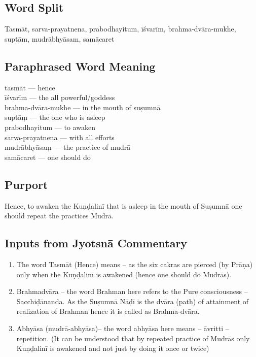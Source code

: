 \subsection*{Word Split}

Tasmāt, sarva-prayatnena, prabodhayitum, īśvarīm, brahma-dvāra-mukhe, suptām, mudrābhyāsam, samācaret

\subsection*{Paraphrased Word Meaning}

\begin{multicols}{2}
tasmāt --- hence \\
īśvarīm --- the all powerful/goddess\\
brahma-dvāra-mukhe --- in the mouth of suṣumnā\\
suptāṃ --- the one who is asleep \\
prabodhayitum --- to awaken\\
sarva-prayatnena --- with all efforts \\
mudrābhyāsaṃ --- the practice of mudrā \\
samācaret ---  one should do
\end{multicols}

\subsection*{Purport}

Hence, to awaken the Kuṇḍalinī that is asleep in the mouth of Suṣumnā one should repeat the practices Mudrā.

\subsection*{Inputs from Jyotsnā Commentary}

\begin{enumerate}
\item The word Tasmāt (Hence) means – as the six cakras are pierced (by Prāṇa) only when the Kuṇḍalinī is awakened (hence one should do Mudrās). 
\item Brahmadvāra – the word Brahman here refers to the Pure consciousness – Sacchiḍānanda. As the Suṣumnā Nāḍī is the dvāra (path) of attainment of realization of Brahman hence it is called as Brahma-dvāra. 
\item Abhyāsa (mudrā-abhyāsa)– the word abhyāsa here means – āvritti – repetition. (It can be understood that by repeated practice of Mudrās only Kuṇḍalinī is awakened and not just by doing it once or twice)
\end{enumerate}
\newpage

